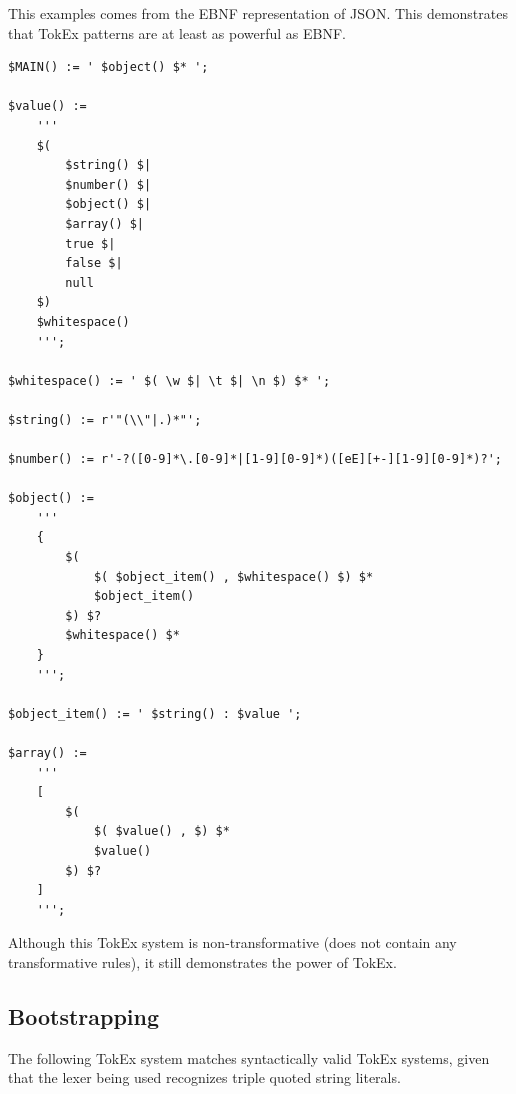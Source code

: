 \documentclass[8pt]{amsart}
\begin{document}
    This examples comes from the EBNF representation of JSON.
    This demonstrates that TokEx patterns are at least as
    powerful as EBNF.

\begin{verbatim}
$MAIN() := ' $object() $* ';

$value() :=
    '''
    $(
        $string() $|
        $number() $|
        $object() $|
        $array() $|
        true $|
        false $|
        null
    $)
    $whitespace()
    ''';

$whitespace() := ' $( \w $| \t $| \n $) $* ';

$string() := r'"(\\"|.)*"';

$number() := r'-?([0-9]*\.[0-9]*|[1-9][0-9]*)([eE][+-][1-9][0-9]*)?';

$object() :=
    '''
    {
        $(
            $( $object_item() , $whitespace() $) $*
            $object_item()
        $) $?
        $whitespace() $*
    }
    ''';

$object_item() := ' $string() : $value ';

$array() :=
    '''
    [
        $(
            $( $value() , $) $*
            $value()
        $) $?
    ]
    ''';

\end{verbatim}

    Although this TokEx system is non-transformative (does not
    contain any transformative rules), it still demonstrates the
    power of TokEx.

    \subsection{Bootstrapping}

    The following TokEx system matches syntactically valid TokEx
    systems, given that the lexer being used recognizes triple
    quoted string literals.
\end{document}
